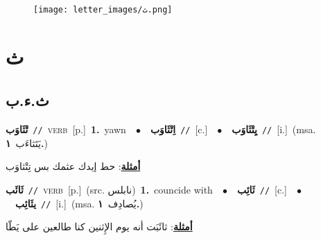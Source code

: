 \documentclass[10pt,a4paper,twoside]{article} %
\begin{document}
\begin{figure*}[t!]\centering\texttt{[image: letter\_images/ث.png]}\end{figure*}
\color{white}

 \section*{\foreignlanguage{arabic}{ث}} 
 \begin{multicols}{2} 

%
\color{black}
\vspace{-3mm}
\subsection*{\color{blue}\foreignlanguage{arabic}{ث.ء.ب}\color{blue}{}} 

{\setlength\topsep{0pt}\textbf{\foreignlanguage{arabic}{تْثَاوَب}}\ {\color{gray}\texttt{//}\color{black}}\ \textsc{verb}\ [p.]\ \textbf{1.}~yawn\ \ $\bullet$\ \ \setlength\topsep{0pt}\textbf{\foreignlanguage{arabic}{اِتْثَاوَب}}\ {\color{gray}\texttt{//}\color{black}}\ [c.]\ \ $\bullet$\ \ \setlength\topsep{0pt}\textbf{\foreignlanguage{arabic}{يِتْثَاوَب}}\ {\color{gray}\texttt{//}\color{black}}\ [i.]\ \color{gray}(msa. \foreignlanguage{arabic}{يَتَثاءَب}~\foreignlanguage{arabic}{\textbf{١.}})\color{black}\  \begin{flushright}\color{gray}\foreignlanguage{arabic}{\textbf{\underline{\foreignlanguage{arabic}{أمثلة}}}: حط إيدك عثمك بس تِتْثاوَب}\end{flushright}\color{black}} \vspace{2mm}

{\setlength\topsep{0pt}\textbf{\foreignlanguage{arabic}{ثَائَب}}\ {\color{gray}\texttt{//}\color{black}}\ \textsc{verb}\ [p.]\ (src. \color{gray}\foreignlanguage{arabic}{نابلس}\color{black})\ \textbf{1.}~councide with\ \ $\bullet$\ \ \setlength\topsep{0pt}\textbf{\foreignlanguage{arabic}{ثَائِب}}\ {\color{gray}\texttt{//}\color{black}}\ [c.]\ \ $\bullet$\ \ \setlength\topsep{0pt}\textbf{\foreignlanguage{arabic}{يثَائِب}}\ {\color{gray}\texttt{//}\color{black}}\ [i.]\ \color{gray}(msa. \foreignlanguage{arabic}{يُصادِف}~\foreignlanguage{arabic}{\textbf{١.}})\color{black}\  \begin{flushright}\color{gray}\foreignlanguage{arabic}{\textbf{\underline{\foreignlanguage{arabic}{أمثلة}}}: ثائَبَت أنه يوم الإِثنين كنا طالعين على يَطّا}\end{flushright}\color{black}} \vspace{2mm}


\end{multicols}
\end{document}
